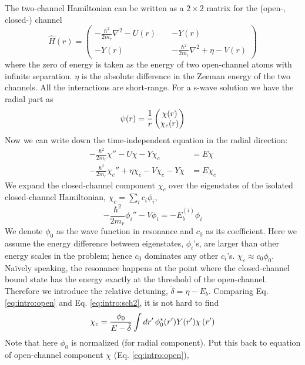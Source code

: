The two-channel Hamiltonian can be written as a $2\times2$ matrix for  the (open-, closed-) channel
\begin{equation}\label{eq:intro:ham}
\hat{H}(r)=
\begin{pmatrix}
-\frac{\hbar^{2}}{2m_{r}}\nabla^{2}-U(r)&\;&-Y(r)\\
-Y(r)&\;&-\frac{\hbar^{2}}{2m_{r}}\nabla^{2}+\eta-V(r)
\end{pmatrix}
\end{equation}
where the  zero of energy is taken as the energy of two open-channel atoms with infinite separation. $\eta$ is the absolute difference in the Zeeman energy of the two channels.  All the interactions are short-range.  For a s-wave solution we have the radial part as 
\begin{equation}
\psi(r)=\frac{1}{r}\begin{pmatrix}\chi(r)\\\chi_{c}(r)\end{pmatrix}
\end{equation}
Now we can write down the time-independent \sch equation in the radial direction:
\begin{align}
-\frac{\hbar^{2}}{2m_{r}}\chi''-U\chi-Y\chi_c&=E\chi\label{eq:intro:open}\\
-\frac{\hbar^{2}}{2m_{r}}\chi_c''+\eta\chi_c-V\chi_c-Y\chi&=E\chi_c\label{eq:intro:close}
\end{align}
We expand the closed-channel component $\chi_{c}$ over the eigenstates of the isolated closed-channel Hamiltonian, $\chi_{c}=\sum_{i}c_{i}\phi_{i}$, 
\begin{equation}\label{eq:intro:sch2}
-\frac{\hbar^{2}}{2m_{r}}\phi_{i}''-V \phi_{i}=-E_{b}^{(i)}\phi_{i}
\end{equation}
We denote $\phi_{0}$ as the wave function  in resonance and $c_{0}$ as its coefficient.  Here we assume the energy difference between eigenstates, $\phi_{i}$'s, are larger than other energy scales in the problem; hence $c_{0}$ dominates any other $c_{i}$'s.  $\chi_{c}\approx{}c_{0}\phi_{0}$.  Na\"{i}vely speaking, the resonance happens at the point where the closed-channel bound state has the energy exactly at the threshold of the open-channel.  Therefore we introduce the relative detuning, $\tilde\delta=\eta-E_{b}$. Comparing Eq. \ref{eq:intro:open} and Eq. \ref{eq:intro:sch2}, it is not hard to find
\begin{equation}\label{eq:intro:closeCoeff}
\chi_{c}=\frac{\phi_{0}}{E-\tilde\delta}\int{dr'}\,\phi_{0}^{*}(r')Y(r')\chi\left(r'\right)
\end{equation}
Note that here $\phi_{0}$ is normalized (for radial component).  Put this back to \sch equation of open-channel component $\chi$ (Eq. \ref{eq:intro:open}), 
